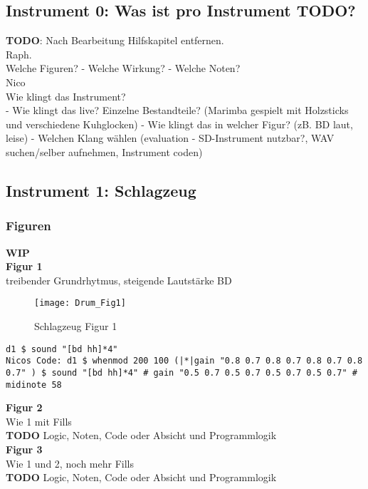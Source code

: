 \documentclass[
10pt, %
a4paper, %
oneside, %
headinclude,footinclude, %
BCOR5mm, %
]{scrartcl}
\begin{document}
\subsection{Instrument 0: Was ist pro Instrument TODO?}
{\color{red}\textbf{TODO}}: Nach Bearbeitung Hilfskapitel entfernen.\\

Raph.\\
Welche Figuren?
- Welche Wirkung?
- Welche Noten?\\

Nico\\
Wie klingt das Instrument?\\
- Wie klingt das live? Einzelne Bestandteile? (Marimba gespielt mit Holzsticks und verschiedene Kuhglocken)
- Wie klingt das in welcher Figur? (zB. BD laut, leise)
- Welchen Klang wählen (evaluation - SD-Instrument nutzbar?, WAV suchen/selber aufnehmen, Instrument coden)\\

\subsection{Instrument 1: Schlagzeug}
\subsubsection{Figuren}
{\color{orange}\textbf{WIP}} \\

\textbf{Figur 1}\\
treibender Grundrhytmus, steigende Lautstärke BD
\begin{figure}[h]
	\centering 
	\texttt{[image: Drum\_Fig1]} 
	\caption{Schlagzeug Figur 1}
\end{figure}

\begin{lstlisting}
d1 $ sound "[bd hh]*4"
Nicos Code: d1 $ whenmod 200 100 (|*|gain "0.8 0.7 0.8 0.7 0.8 0.7 0.8 0.7" ) $ sound "[bd hh]*4" # gain "0.5 0.7 0.5 0.7 0.5 0.7 0.5 0.7" # midinote 58
\end{lstlisting}

\noindent \textbf{Figur 2}\\
Wie 1 mit Fills\\
{\color{red}\textbf{TODO}} Logic, Noten, Code oder Absicht und Programmlogik\\

\noindent \textbf{Figur 3}\\
Wie 1 und 2, noch mehr Fills\\
{\color{red}\textbf{TODO}} Logic, Noten, Code oder Absicht und Programmlogik\\
\end{document}
